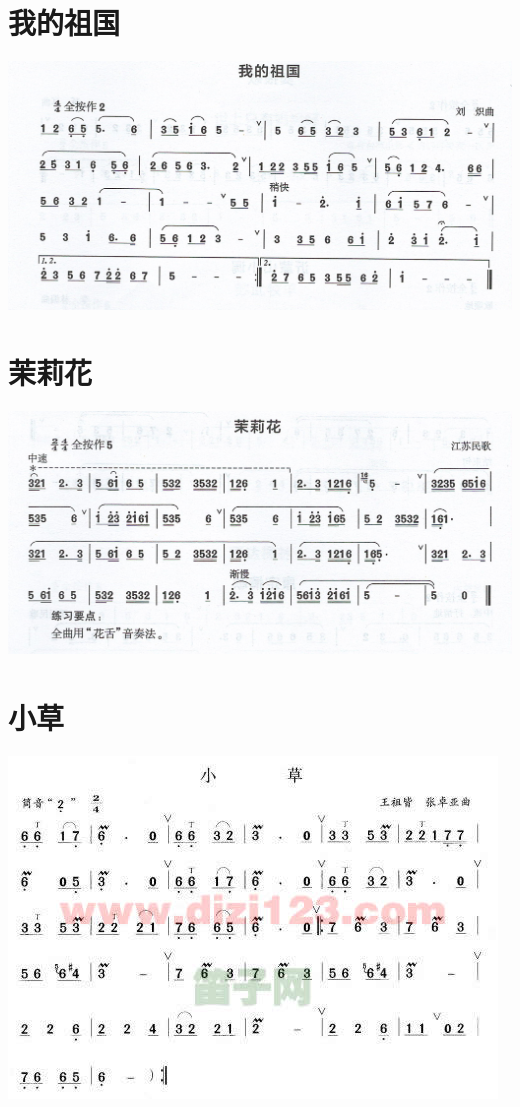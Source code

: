 \documentclass[cn,pad,chinese,chinesefont=nofont]{elegantbook}
\begin{document}
\section{我的祖国}
\includegraphics[width=\textwidth]{dongxiao/Scan 19-1.jpeg}
\section{茉莉花}
\includegraphics[width=\textwidth]{dongxiao/Scan 19-2.jpeg}

\section{小草}
	\includegraphics[width=\textwidth]{dongxiao/小草.jpg}
\end{document}
